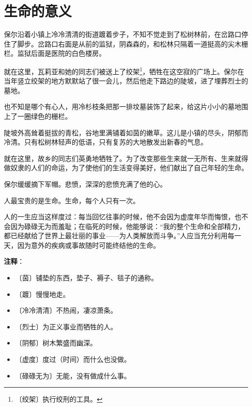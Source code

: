 \documentclass[12pt,UTF-8,openany]{ctexbook}
\begin{document}
\chapter{生命的意义}

\begin{large}
    
    保尔沿着小镇上冷冷清清的街道踱着步子，不知不觉走到了松树林前，在岔路口停住了脚步。岔路口右面是从前的监狱，阴森森的，和松林只隔着一道挺高的尖木栅栏。监狱后面是医院的白色楼房。
    
    就在这里，瓦莉亚和她的同志们被送上了绞架\footnote{〔绞架〕执行绞刑的工具。}，牺牲在这空寂的广场上。保尔在当年竖立绞架的地方默默站了很一会儿，然后他走下路边的陡坡，进了埋葬烈士的墓地。
    
    也不知是哪个有心人，用冷杉枝条把那一排坟墓装饰了起来，给这片小小的墓地围上了一圈绿色的栅栏。
    
    陡坡外高耸着挺拔的青松，谷地里满铺着如茵的嫩草。这儿是小镇的尽头，阴郁而冷清。只有松树林轻声的低语，只有复苏的大地散发出新春的气息。
    
    就在这里，故乡的同志们英勇地牺牲了。为了改变那些生来就一无所有、生来就得做奴隶的人们的命运，为了使他们的生活变得美好，他们献出了自己年轻的生命。
    
    保尔缓缓摘下军帽。悲愤，深深的悲愤充满了他的心。
    
    人最宝贵的是生命。生命，每个人只有一次。
    
    人的一生应当这样度过：每当回忆往事的时候，他不会因为虚度年华而悔恨，也不会因为碌碌无为而羞耻；在临死的时候，他能够说：“我的整个生命和全部精力，都已经献给了世界上最壮丽的事业——为人类解放而斗争。”人应当充分利用每一天，因为意外的疾病或事故随时可能终结他的生命。
    
\end{large}


\newpage

\textbf{注释}：

\vspace{-1em}

\begin{itemize}
    \setlength\itemsep{-0.2em}
    \item 〔茵〕铺垫的东西，垫子、褥子、毯子的通称。
    \item 〔踱〕慢慢地走。
    \item 〔冷冷清清〕不热闹，凄凉萧条。
    \item 〔烈士〕为正义事业而牺牲的人。
    \item 〔阴郁〕树木繁盛而幽深。
    \item 〔虚度〕度过（时间）而什么也没做。
    \item 〔碌碌无为〕无能，没有做成什么事。
\end{itemize}
\end{document}
